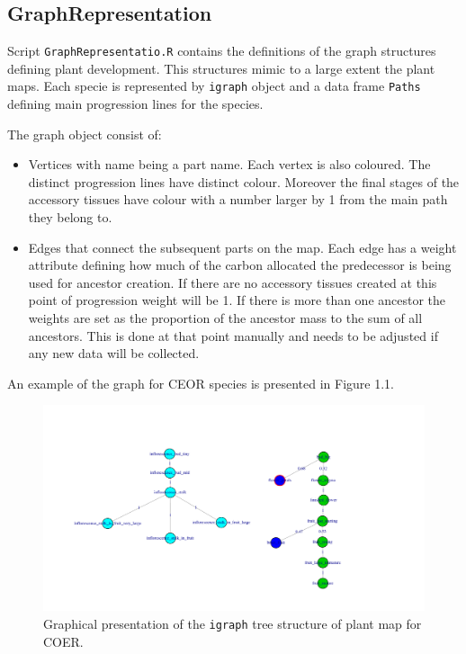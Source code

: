 \documentclass[10pt]{book} %
\begin{document}
\subsection{GraphRepresentation}

Script \texttt{GraphRepresentatio.R} contains the definitions of the graph structures defining plant development. This structures mimic to a large extent the plant maps.
Each specie is represented by \texttt{igraph} object and a data frame \texttt{Paths} defining main progression lines for the species.

The graph object consist of:
\begin{itemize}
\item Vertices with name being a part name. Each vertex is also coloured. The distinct progression lines have distinct colour. Moreover the final stages of the accessory tissues have colour with a number larger by 1 from the main path they belong to.
\item Edges that connect the subsequent parts on the map. Each edge has a weight attribute defining how much of the carbon allocated the predecessor is being used for ancestor creation. If there are no accessory tissues created at this point of progression weight will be 1. If there is more than one ancestor the weights are set as the proportion of the ancestor mass to the sum of all ancestors. This is done at that point manually and needs to be adjusted if any new data will be collected.
\end{itemize}
An example of the graph for CEOR species is presented in Figure 1.1.


\begin{figure}[htb]
\begin{center}
\includegraphics[width=6in]{PlantGraph.pdf}
\end{center}
\caption{Graphical presentation of the \texttt{igraph} tree structure of plant map for COER.}
\end{figure}
\end{document}
